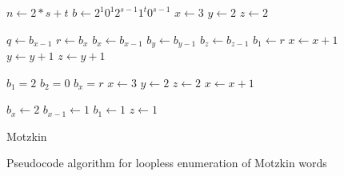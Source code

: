 \begin{figure}[H]
    \centering
        \begin{algorithm}[H]
        \begin{algorithmic}
        \EndFunction{}
         
        \State $n \gets 2*s+t$
        \State $b \gets 2^1 0^1 2^{s-1} 1^t 0^{s-1}$
        \State $x \gets 3$
        \State $y \gets 2$
        \State $z \gets 2$
        
        \State {}
        
            \State $q \gets b_{x-1}$
            \State $r \gets b_x$
            \vspace{.4em} 
            \State $b_x\gets b_{x-1}$
            \State $b_y\gets b_{y-1}$
            \State $b_z\gets b_{z-1}$
            \State $b_1\gets r$
            \vspace{.4em} 
            \State $x \gets x+1$
            \State $y \gets y+1$
            \State $z \gets y+1$
            
            \vspace{.4em} 
                    \State $b_1=2$
                    \State $b_2=0$
                    \State $b_x=r$
                    \State $x \gets 3$
                    \State $y \gets 2$
                    \State $z \gets 2$
                \Else 
                    \State $x \gets x+1$
                
                \EndIf
                    \State $b_x \gets 2$     
                    \State $b_{x-1} \gets 1$     
                    \State $b_1 \gets 1$     
                    \State $z \gets 1$     
                
            \EndIf
        \EndWhile
        \end{algorithmic}
        \caption{Motzkin}
        \end{algorithm}
    \caption{Pseudocode algorithm for loopless enumeration of Motzkin words}
    \label{fig:motzkinAlg}
\end{figure}
